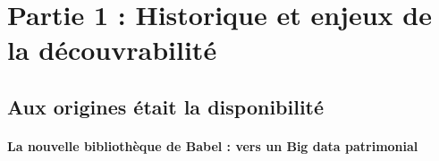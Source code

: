 
\part{Partie 1 : Historique et enjeux de la découvrabilité}
\chapter{Aux origines était la disponibilité}

\subsection{La nouvelle bibliothèque de Babel : vers un Big data patrimonial}

